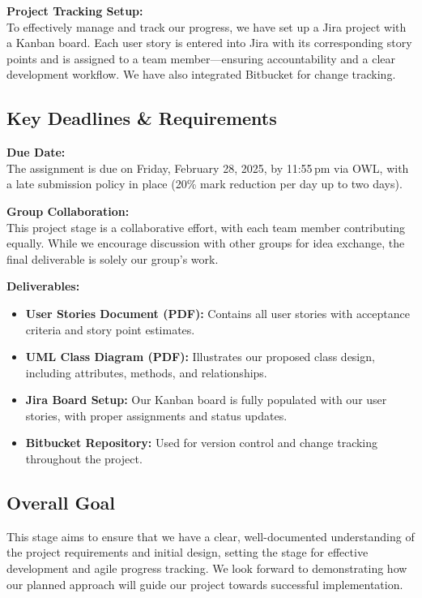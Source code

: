 \documentclass[12pt]{article}
\begin{document}
\textbf{Project Tracking Setup:} \\
To effectively manage and track our progress, we have set up a Jira project with a Kanban board. Each user story is entered into Jira with its corresponding story points and is assigned to a team member—ensuring accountability and a clear development workflow. We have also integrated Bitbucket for change tracking.

\subsection*{Key Deadlines \& Requirements}

\textbf{Due Date:} \\
The assignment is due on Friday, February 28, 2025, by 11:55\,pm via OWL, with a late submission policy in place (20\% mark reduction per day up to two days).

\textbf{Group Collaboration:} \\
This project stage is a collaborative effort, with each team member contributing equally. While we encourage discussion with other groups for idea exchange, the final deliverable is solely our group’s work.

\textbf{Deliverables:}
\begin{itemize}
    \item \textbf{User Stories Document (PDF):} Contains all user stories with acceptance criteria and story point estimates.
    \item \textbf{UML Class Diagram (PDF):} Illustrates our proposed class design, including attributes, methods, and relationships.
    \item \textbf{Jira Board Setup:} Our Kanban board is fully populated with our user stories, with proper assignments and status updates.
    \item \textbf{Bitbucket Repository:} Used for version control and change tracking throughout the project.
\end{itemize}

\subsection{Overall Goal}

This stage aims to ensure that we have a clear, well-documented understanding of the project requirements and initial design, setting the stage for effective development and agile progress tracking. We look forward to demonstrating how our planned approach will guide our project towards successful implementation.
\end{document}
